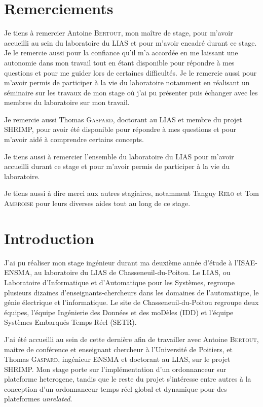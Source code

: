 \documentclass{article}
\begin{document}
    \newpage
    \section*{Remerciements}

    Je tiens à remercier Antoine \textsc{Bertout}, mon maître de stage, pour m'avoir accueilli au sein du laboratoire du LIAS et pour m'avoir encadré durant ce stage. Je le remercie aussi pour la confiance qu'il m'a accordée en me laissant une autonomie dans mon travail tout en étant disponible pour répondre à mes questions et pour me guider lors de certaines difficultés. Je le remercie aussi pour m'avoir permis de participer à la vie du laboratoire notamment en réalisant un séminaire sur les travaux de mon stage où j'ai pu présenter puis échanger avec les membres du laboratoire sur mon travail.
    
    Je remercie aussi Thomas \textsc{Gaspard}, doctorant au LIAS et membre du projet SHRIMP, pour avoir été disponible pour répondre à mes questions et pour m'avoir aidé à comprendre certains concepts.

    Je tiens aussi à remercier l'ensemble du laboratoire du LIAS pour m'avoir accueilli durant ce stage et pour m'avoir permis de participer à la vie du laboratoire.

    Je tiens aussi à dire merci aux autres stagiaires, notamment Tanguy \textsc{Relo} et Tom \textsc{Ambroise} pour leurs diverses aides tout au long de ce stage.
    
    \newpage
    \tableofcontents

    \newpage
    \thispagestyle{empty}
    \mbox{}
    \newpage
    
    \section{Introduction}

    
    J'ai pu réaliser mon stage ingénieur durant ma deuxième année d'étude à l'ISAE-ENSMA, au laboratoire du LIAS de Chasseneuil-du-Poitou. Le LIAS, ou Laboratoire d'Informatique et d'Automatique pour les Systèmes, regroupe plusieurs dizaines d'enseignants-chercheurs dans les domaines de l'automatique, le génie électrique et l'informatique. Le site de Chasseneuil-du-Poitou regroupe deux équipes, l'équipe Ingénierie des Données et des moDèles (IDD) et l'équipe Systèmes Embarqués Temps Réel (SETR). 

    J'ai été accueilli au sein de cette dernière afin de travailler avec Antoine \textsc{Bertout}, maitre de conférence et enseignant chercheur à l'Université de Poitiers, et Thomas \textsc{Gaspard}, ingénieur ENSMA et doctorant au LIAS, sur le projet \gls{SHRIMP}. Mon stage porte sur l'implémentation d'un \gls{ordonnanceur} sur \gls{plateforme heterogene}\cite{bertout2020workload}, tandis que le reste du projet s'intéresse entre autres à la conception d'un \gls{ordonnanceur} temps réel global et dynamique pour des plateformes \textit{unrelated}.
\end{document}
